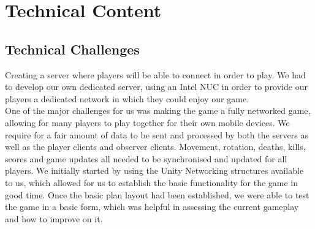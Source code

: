 \chapter{Technical Content}







\section{Technical Challenges}
\markboth{\MakeUppercase{\thechapter}}
Creating a server where players will be able to connect in order to play. We had to develop our own dedicated server, using an Intel NUC in order to provide our players a dedicated network in which they could enjoy our game.\\


One of the major challenges for us was making the game a fully networked game, allowing for many players to play together for their own mobile devices. We require for a fair amount of data to be sent and processed by both the servers as well as the player clients and observer clients. Movement, rotation, deaths, kills, scores and game updates all needed to be synchronised and updated for all players. We initially started by using the Unity Networking structures available to us, which allowed for us to establish the basic functionality for the game in good time. Once the basic plan layout had been established, we were able to test the game in a basic form, which was helpful in assessing the current gameplay and how to improve on it. \\

